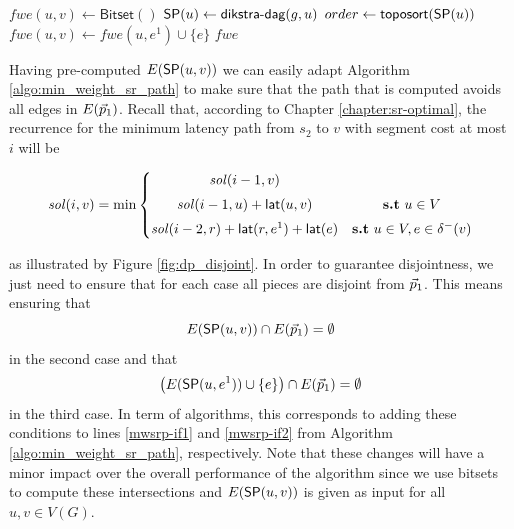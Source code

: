 

\begin{algorithm}[t]
\small
\caption{$\textsf{precompute-forwEdges}\left( g \right)$}
\begin{algorithmic}[1]
  \STATE $fwe(u, v) \gets \textsf{Bitset}()$
\ENDFOR
{}
  \STATE $\sp(u) \gets \textsf{dikstra-dag}(g, u)$
  \STATE $order \gets \textsf{toposort}(\sp(u))$
      \STATE $fwe(u, v) \gets fwe(u, e^1) \cup \{ e \}$
    \ENDFOR
  \ENDFOR
\ENDFOR
\RETURN $fwe$
\end{algorithmic}
\label{algo:preforw}
\end{algorithm}

Having pre-computed $E(\sp(u, v))$ we can easily adapt Algorithm
\ref{algo:min_weight_sr_path} to make sure that the path that is computed avoids all
edges in $E(\sr{p}_1)$. Recall that, according to Chapter \ref{chapter:sr-optimal}, 
the recurrence for the minimum latency path
from $s_2$ to $v$ with segment cost at most $i$ will be

\[\mathit{sol}(i, v) = \min \left\{
  \begin{matrix}
    \mathit{sol}(i - 1, v) &  \\[0.2cm]
    \mathit{sol}(i - 1, u)  +  \lat(u, v)  & \textbf{s.t} \text{ $u \in V$} \\[0.2cm]
    \mathit{sol}(i - 2, r)  +  \lat(r, e^1) + \lat(e) & \textbf{s.t} \text{ $u \in V, e \in \ine(v)$} \\
\end{matrix}
  \right.
\]

as illustrated by Figure \ref{fig:dp_disjoint}. In order to guarantee disjointness,
we just need to ensure that for each case all pieces are disjoint
from $\sr{p}_1$. This means ensuring that 
$$
E(\sp(u, v)) \cap E(\sr{p}_1) = \emptyset
$$
in the second case and that 
$$\left( E(\sp(u, e^1)) \cup \{ e \} \right) \cap E(\sr{p}_1) = \emptyset
$$
in the third case. In term of algorithms, this corresponds to adding these conditions
to lines \ref{mwsrp-if1} and \ref{mwsrp-if2} from Algorithm \ref{algo:min_weight_sr_path}, respectively. Note that these changes will
have a minor impact over the overall performance of the algorithm since we use bitsets
to compute these intersections and $E(\sp(u, v))$ is given as input for all $u, v \in V(G)$.

